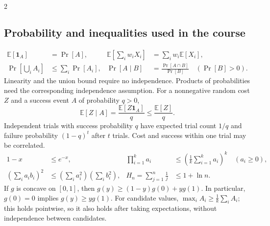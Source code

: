 \documentclass[10pt]{article}
\theoremstyle{definition}
\begin{document}
\begin{multicols*}{2}
\subsection{Probability and inequalities used in the course}
\begin{align*}
\mathbb E[\mathbf1_A]&=\Pr[A], &
\mathbb E\!\left[\sum_iw_iX_i\right]&=\sum_iw_i\mathbb E[X_i],\\
\Pr\!\left[\bigcup_i A_i\right]&\le\sum_i\Pr[A_i], &
\Pr[A\mid B]&=\frac{\Pr[A\cap B]}{\Pr[B]}\quad(\Pr[B]>0).
\end{align*}
Linearity and the union bound require no independence. Products of probabilities need
the corresponding independence assumption. For a nonnegative random cost $Z$ and a success
event $A$ of probability $q>0$,
\[
\mathbb E[Z\mid A]=\frac{\mathbb E[Z\mathbf1_A]}q\le\frac{\mathbb E[Z]}q.
\]
Independent trials with success probability $q$ have expected trial count $1/q$ and
failure probability $(1-q)^t$ after $t$ trials. Cost and success within one trial may be correlated.
\begin{align*}
1-x&\le e^{-x}, &
\prod_{i=1}^k a_i&\le\left(\frac1k\sum_{i=1}^k a_i\right)^k\quad(a_i\ge0),\\
\left(\sum_i a_ib_i\right)^2&\le\left(\sum_i a_i^2\right)\left(\sum_i b_i^2\right), &
H_n=\sum_{j=1}^n\frac1j&\le1+\ln n.
\end{align*}
If $g$ is concave on $[0,1]$, then
$g(y)\ge(1-y)g(0)+yg(1)$. In particular, $g(0)=0$ implies $g(y)\ge yg(1)$.
For candidate values, $\max_i A_i\ge\frac1k\sum_i A_i$; this holds pointwise, so it also
holds after taking expectations, without independence between candidates.


\end{multicols*}
\end{document}
